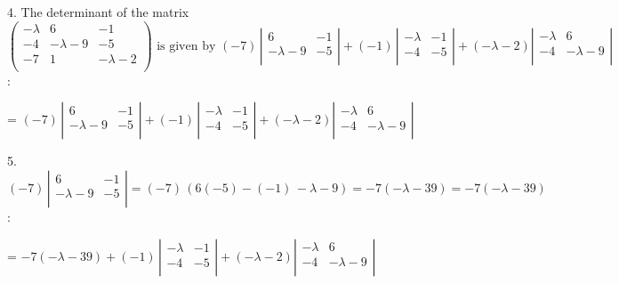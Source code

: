 \documentclass{article}
\begin{document}
4. The determinant of the matrix $\left(
    \begin{array}{ccc}
-\lambda & 6           & -1          \\
        -4       & -\lambda -9 & -5          \\
        -7       & 1           & -\lambda -2 \\
      \end{array}
    \right)\text{ is given by }(-7)\, \left|
    \begin{array}{cc}
6           & -1 \\
      -\lambda -9 & -5 \\
    \end{array}
    \right| +(-1)\, \left|
    \begin{array}{cc}
-\lambda & -1 \\
      -4       & -5 \\
    \end{array}
    \right| +(-\lambda -2) \left|
    \begin{array}{cc}
-\lambda & 6           \\
      -4       & -\lambda -9 \\
    \end{array}
    \right|$ :

= $(-7)\, \left|
    \begin{array}{cc}
6           & -1 \\
      -\lambda -9 & -5 \\
    \end{array}
    \right| +(-1)\, \left|
    \begin{array}{cc}
-\lambda & -1 \\
      -4       & -5 \\
    \end{array}
    \right| +(-\lambda -2) \left|
    \begin{array}{cc}
-\lambda & 6           \\
      -4       & -\lambda -9 \\
    \end{array}
    \right|$

5. $(-7)\, \left|
    \begin{array}{cc}
6           & -1 \\
      -\lambda -9 & -5 \\
    \end{array}
    \right| =(-7)\, (6 (-5)-(-1)\, -\lambda -9)=-7 (-\lambda -39)=-7 (-\lambda -39)$:

= $-7 (-\lambda -39)+(-1)\, \left|
    \begin{array}{cc}
-\lambda & -1 \\
      -4       & -5 \\
    \end{array}
    \right| +(-\lambda -2) \left|
    \begin{array}{cc}
-\lambda & 6           \\
      -4       & -\lambda -9 \\
    \end{array}
    \right|$
\end{document}
